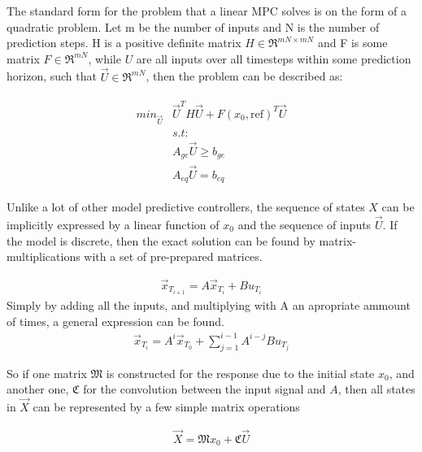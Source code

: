 \noindent
The standard form for the problem that a linear MPC solves is on the form of a quadratic problem. Let m be the number of inputs and N is the number of prediction steps. H is a positive definite matrix $H \in \Re^{mN \times  mN}$ and F is some matrix $F \in \Re^{mN}$, while $U$ are all inputs over all timesteps within some prediction horizon, such that $\vec{U}\in \Re^{mN}$, then the problem can be described as: 

\begin{gather}
  \begin{split}    
  min_{\vec{U}} &       \vec{U}^T H\vec{U} + F\left( x_0, \text{ref}\right)^T \vec{U} \\
                & s.t:                                                                \\
                &       A_{ge} \vec{U} \geq b_{ge}                                    \\
                &       A_{eq} \vec{U} = b_{eq}                                       
  \end{split}
  \label{eq:linear_MPC_problem}
\end{gather}

\noindent
Unlike a lot of other model predictive controllers, the sequence of states $X$ can be implicitly expressed by a linear function of $x_0$ and the sequence of inputs $\vec{U}$. If the model is discrete, then the exact solution can be found by matrix-multiplications with a set of pre-prepared matrices. 

\begin{align}
  \vec{x}_{ T_{i+1}} = A\vec{x}_{ T_{i}}  + Bu_{ T_{i}}
\end{align}
Simply by adding all the inputs, and multiplying with A an apropriate ammount of times, a general expression can be found.
\begin{align}
  \vec{x}_{ T_{i} } = A^{i}\vec{x}_{ T_{0} }  + \sum_{j=1}^{i-1} A^{i-j}Bu_{T_{j}}
  \label{eq:multi_step_discrete_system}
\end{align}

\noindent
So if one matrix $\mathfrak{M}$ is constructed for the response due to the initial state $x_0$, and another one, $\mathfrak{C}$ for the convolution between the input signal and $A$, then all states in $\vec{X}$ can be represented by a few simple matrix operations

\begin{align}
  \vec{X} = \mathfrak{M} x_0 + \mathfrak{C} \vec{U}
\end{align}

